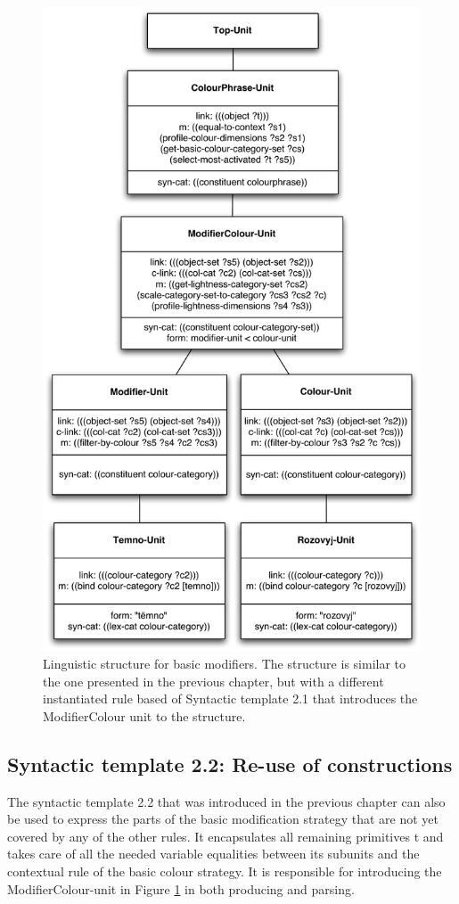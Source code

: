 \begin{figure}[htbp]
  \centering
  \includegraphics[width=.8\textwidth]{./achromatic/figures/linguistic-structure.pdf}
  \caption[Linguistic structure for basic modifiers]{Linguistic
    structure for basic modifiers. The structure is similar to the
    one presented in the previous chapter, but with a different
    instantiated rule based of Syntactic template 2.1 that introduces
    the ModifierColour unit to the structure.}
  \label{f:ams-linguistic-structure}
\end{figure}

\subsection{Syntactic template 2.2: Re-use of constructions}

The syntactic template 2.2 that was introduced in the previous chapter
can also be used to express the parts of the basic
  modification strategy that are not yet covered by any of the other
rules. It encapsulates all remaining primitives t and takes care of
all the needed variable equalities between its subunits and the
contextual rule of the basic colour strategy. It is responsible for
introducing the ModifierColour-unit in Figure
\ref{f:ams-linguistic-structure} in both producing and parsing.

